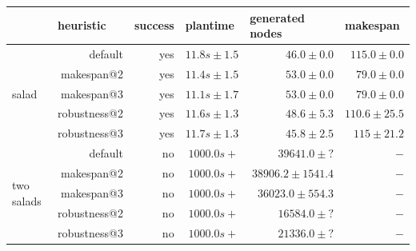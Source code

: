 \begin{table}[t]
\begin{minipage}{\textwidth}
    \begin{center}
      
    \begin{tabular}{p{1.5cm}rrrrr}
    \multicolumn{1}{l}{}         & \multicolumn{1}{l}{heuristic} & success & \multicolumn{1}{l}{plantime} & \multicolumn{1}{l}{generated nodes} & \multicolumn{1}{l}{makespan} \\ \hline \hline
    \multirow{5}{*}{salad}        & default                       & yes     & $11.8s\pm1.5 $              & $46.0\pm0.0$                         & $115.0 \pm0.0$               \\ 
                                  & makespan@2                    & yes     & $11.4s\pm1.5 $              & $53.0\pm0.0$                         & $79.0  \pm0.0$               \\ 
                                  & makespan@3                    & yes     & $11.1s\pm1.7 $              & $53.0\pm0.0$                         & $79.0  \pm0.0$               \\
                                  & robustness@2                  & yes     & $11.6s\pm1.3 $              & $48.6\pm5.3$                         & $110.6 \pm25.5$               \\ 
                                  & robustness@3                  & yes     & $11.7s\pm1.3 $              & $45.8\pm2.5$                         & $115 \pm21.2$               \\\hline
    \multirow{5}{*}{\parbox{1.2cm}{two salads}}   
                                  & default                       & no      & $1000.0s+$                  & $39641.0\pm?$                        & $-     $                     \\
                                  & makespan@2                    & no      & $1000.0s+$                  & $38906.2\pm1541.4$                   & $-     $                     \\
                                  & makespan@3                    & no      & $1000.0s+$                  & $36023.0\pm554.3$                    & $-     $                     \\
                                  & robustness@2                  & no      & $1000.0s+$                  & $16584.0\pm?$                        & $-     $                     \\ 
                                  & robustness@3                  & no      & $1000.0s+$                  & $21336.0\pm?$                        & $-     $                     \\\hline

\end{tabular}
\end{center}
\end{minipage}
\end{table}
